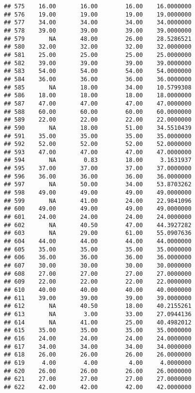 \documentclass[
]{article}
\begin{document}
\begin{verbatim}
## 575    16.00       16.00        16.00    16.0000000
## 576    19.00       19.00        19.00    19.0000000
## 577    34.00       34.00        34.00    34.0000000
## 578    39.00       39.00        39.00    39.0000000
## 579       NA       48.00        26.00    28.5286521
## 580    32.00       32.00        32.00    32.0000000
## 581    25.00       25.00        25.00    25.0000000
## 582    39.00       39.00        39.00    39.0000000
## 583    54.00       54.00        54.00    54.0000000
## 584    36.00       36.00        36.00    36.0000000
## 585       NA       18.00        34.00    10.5799308
## 586    18.00       18.00        18.00    18.0000000
## 587    47.00       47.00        47.00    47.0000000
## 588    60.00       60.00        60.00    60.0000000
## 589    22.00       22.00        22.00    22.0000000
## 590       NA       18.00        51.00    34.5510439
## 591    35.00       35.00        35.00    35.0000000
## 592    52.00       52.00        52.00    52.0000000
## 593    47.00       47.00        47.00    47.0000000
## 594       NA        0.83        18.00     3.1631937
## 595    37.00       37.00        37.00    37.0000000
## 596    36.00       36.00        36.00    36.0000000
## 597       NA       50.00        34.00    53.8703262
## 598    49.00       49.00        49.00    49.0000000
## 599       NA       41.00        24.00    22.9841096
## 600    49.00       49.00        49.00    49.0000000
## 601    24.00       24.00        24.00    24.0000000
## 602       NA       40.50        47.00    44.3927282
## 603       NA       29.00        61.00    55.0907636
## 604    44.00       44.00        44.00    44.0000000
## 605    35.00       35.00        35.00    35.0000000
## 606    36.00       36.00        36.00    36.0000000
## 607    30.00       30.00        30.00    30.0000000
## 608    27.00       27.00        27.00    27.0000000
## 609    22.00       22.00        22.00    22.0000000
## 610    40.00       40.00        40.00    40.0000000
## 611    39.00       39.00        39.00    39.0000000
## 612       NA       40.50        18.00    40.2155261
## 613       NA        3.00        33.00    27.0944136
## 614       NA       41.00        25.00    40.4982012
## 615    35.00       35.00        35.00    35.0000000
## 616    24.00       24.00        24.00    24.0000000
## 617    34.00       34.00        34.00    34.0000000
## 618    26.00       26.00        26.00    26.0000000
## 619     4.00        4.00         4.00     4.0000000
## 620    26.00       26.00        26.00    26.0000000
## 621    27.00       27.00        27.00    27.0000000
## 622    42.00       42.00        42.00    42.0000000

\end{verbatim}
\end{document}
